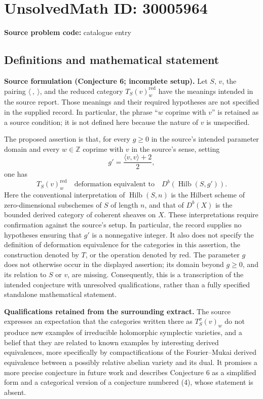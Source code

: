 \documentclass[11pt]{article}
\newcommand{\Z}{\mathbb{Z}}
\begin{document}
\section*{UnsolvedMath ID: 30005964}
\textbf{Source problem code:} catalogue entry
\subsection{Definitions and mathematical statement}
\textbf{Source formulation (Conjecture 6; incomplete setup).} Let \(S\), \(v\), the pairing \(\langle\ ,\ \rangle\), and the reduced category \(T_S(v)_w^{\mathrm{red}}\) have the meanings intended in the source report. Those meanings and their required hypotheses are not specified in the supplied record. In particular, the phrase ``\(w\) coprime with \(v\)'' is retained as a source condition; it is not defined here because the nature of \(v\) is unspecified.

The proposed assertion is that, for every \(g\geq 0\) in the source's intended parameter domain and every \(w\in\Z\) coprime with \(v\) in the source's sense, setting
\[
 g'=\frac{\langle v,v\rangle+2}{2},
\]
one has
\[
 T_S(v)_w^{\mathrm{red}}
 \quad\text{deformation equivalent to}\quad
 D^b\!\left(\operatorname{Hilb}(S,g')\right).
\]
Here the conventional interpretation of \(\operatorname{Hilb}(S,n)\) is the Hilbert scheme of zero-dimensional subschemes of \(S\) of length \(n\), and that of \(D^b(X)\) is the bounded derived category of coherent sheaves on \(X\). These interpretations require confirmation against the source's setup. In particular, the record supplies no hypotheses ensuring that \(g'\) is a nonnegative integer. It also does not specify the definition of deformation equivalence for the categories in this assertion, the construction denoted by \(T\), or the operation denoted by \(\mathrm{red}\). The parameter \(g\) does not otherwise occur in the displayed assertion; its domain beyond \(g\geq0\), and its relation to \(S\) or \(v\), are missing. Consequently, this is a transcription of the intended conjecture with unresolved qualifications, rather than a fully specified standalone mathematical statement.

\textbf{Qualifications retained from the surrounding extract.} The source expresses an expectation that the categories written there as \(T_S^\sigma(v)_w\) do not produce new examples of irreducible holomorphic symplectic varieties, and a belief that they are related to known examples by interesting derived equivalences, more specifically by compactifications of the Fourier--Mukai derived equivalence between a possibly relative abelian variety and its dual. It promises a more precise conjecture in future work and describes Conjecture 6 as a simplified form and a categorical version of a conjecture numbered (4), whose statement is absent.
\end{document}
